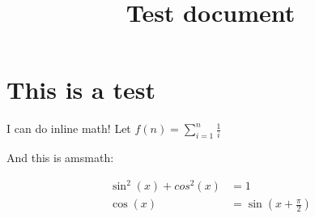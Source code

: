 \documentclass{amsproc}
\begin{document}
\thispagestyle{empty}

\title{Test document}

\section{This is a test}

I can do inline math! Let  $f(n)=\sum_{i=1}^n \frac{1}{i}$

And this is amsmath:

\begin{align}
  \label{eq:test}
  \sin^2(x)+cos^2(x)&=1\\
  \cos(x)&=\sin\left(x+\frac{\pi}{2}\right)
\end{align}
\end{document}
